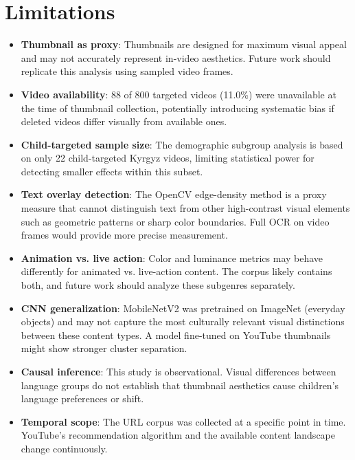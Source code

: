\documentclass[12pt, letterpaper]{article}
\begin{document}
\section{Limitations}
\label{sec:limitations}

\begin{itemize}
\setlength{\itemsep}{0pt}
\setlength{\parskip}{0pt}
    \item \textbf{Thumbnail as proxy}: Thumbnails are designed for maximum visual appeal and may not accurately represent in-video aesthetics. Future work should replicate this analysis using sampled video frames.
    \item \textbf{Video availability}: 88 of 800 targeted videos (11.0\%) were unavailable at the time of thumbnail collection, potentially introducing systematic bias if deleted videos differ visually from available ones.
    \item \textbf{Child-targeted sample size}: The demographic subgroup analysis is based on only 22 child-targeted Kyrgyz videos, limiting statistical power for detecting smaller effects within this subset.
    \item \textbf{Text overlay detection}: The OpenCV edge-density method is a proxy measure that cannot distinguish text from other high-contrast visual elements such as geometric patterns or sharp color boundaries. Full OCR on video frames would provide more precise measurement.
    \item \textbf{Animation vs. live action}: Color and luminance metrics may behave differently for animated vs. live-action content. The corpus likely contains both, and future work should analyze these subgenres separately.
    \item \textbf{CNN generalization}: MobileNetV2 was pretrained on ImageNet (everyday objects) and may not capture the most culturally relevant visual distinctions between these content types. A model fine-tuned on YouTube thumbnails might show stronger cluster separation.
    \item \textbf{Causal inference}: This study is observational. Visual differences between language groups do not establish that thumbnail aesthetics cause children's language preferences or shift.
    \item \textbf{Temporal scope}: The URL corpus was collected at a specific point in time. YouTube's recommendation algorithm and the available content landscape change continuously.
\end{itemize}
\end{document}
